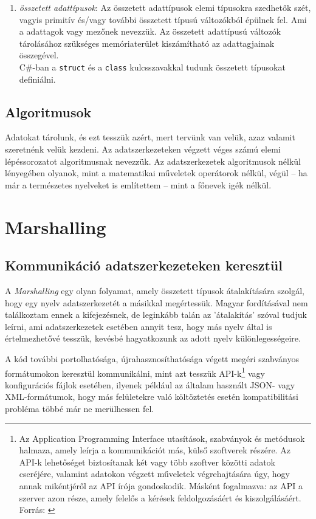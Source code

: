 \documentclass[tocnopagenum]{thesis-ekf}
\theoremstyle{definition}
\theoremstyle{remark}
\begin{document}
\begin{enumerate}[label=\alph*)]
\begin{enumerate}
\begin{tabular}{cc}
			\end{tabular}
		\end{enumerate}
		\item \emph{összetett adattípusok}: Az összetett adattípusok elemi típusokra szedhetők szét, vagyis primitív és/vagy további összetett típusú változókból épülnek fel. Ami a adattagok vagy mezőnek nevezzük. Az összetett adattípusú változók tárolásához szükséges memóriaterület kiszámítható az adattagjainak összegével.\\
		C\#-ban a \verb*|struct| és a \verb*|class| kulcsszavakkal tudunk összetett típusokat definiálni.
	\end{enumerate}
	
	\section{Algoritmusok}
	Adatokat tárolunk, és ezt tesszük azért, mert tervünk van velük, azaz valamit szeretnénk velük kezdeni. Az adatszerkezeteken végzett véges számú elemi lépéssorozatot algoritmusnak nevezzük. Az adatszerkezetek algoritmusok nélkül lényegében olyanok, mint a matematikai műveletek operátorok nélkül, végül -- ha már a természetes nyelveket is említettem -- mint a főnevek igék nélkül.
	
	\chapter{Marshalling}
	\section{Kommunikáció adatszerkezeteken keresztül}
	A \emph{Marshalling} egy olyan folyamat, amely összetett típusok átalakítására szolgál, hogy egy nyelv adatszerkezetét a másikkal megértessük. Magyar fordításával nem találkoztam ennek a kifejezésnek, de leginkább talán az 'átalakítás' szóval tudjuk leírni, ami adatszerkezetek esetében annyit tesz, hogy más nyelv által is értelmezhetővé tesszük, kevésbé hagyatkozunk az adott nyelv különlegességeire.\cite{sof_marshalling}
	\par
	A kód további portolhatósága, újrahasznosíthatósága végett megéri szabványos formátumokon keresztül kommunikálni, mint azt tesszük API-k\footnote{Az Application Programming Interface utasítások, szabványok és metódusok halmaza, amely leírja a kommunikációt más, külső szoftverek részére. Az API-k lehetőséget biztosítanak két vagy több szoftver közötti adatok cseréjére, valamint adatokon végzett műveletek végrehajtására úgy, hogy annak mikéntjéről az API írója gondoskodik. Másként fogalmazva: az API a szerver azon része, amely felelős a kérések feldolgozásáért és kiszolgálásáért. Forrás: \cite{api}} vagy konfigurációs fájlok esetében, ilyenek például az általam használt JSON- vagy XML-formátumok,  hogy más felületekre való költöztetés esetén kompatibilitási probléma többé már ne merülhessen fel.
	
\end{document}
